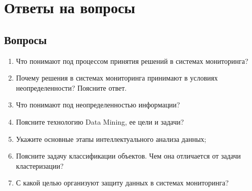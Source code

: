 \documentclass[a4paper, 12pt]{article}
\begin{document}
\section{Ответы на вопросы}
\subsection*{Вопросы}
\begin{enumerate}
  \item Что понимают под процессом принятия решений в системах мониторинга?
  \item Почему решения в системах мониторинга принимают в условиях неопределенности? Поясните ответ.
  \item Что понимают под неопределенностью информации?
  \item Поясните технологию Data Mining, ее цели и задачи?
  \item Укажите основные этапы интеллектуального анализа данных;
  \item Поясните задачу классификации объектов. Чем она отличается от задачи кластеризации?
  \item С какой целью организуют защиту данных в системах мониторинга?
\end{enumerate}
\end{document}
